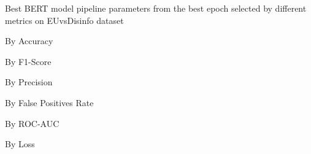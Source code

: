 \begin{table}[!htbp]
    \caption{Best BERT model pipeline parameters from the best epoch selected by different metrics on EUvsDisinfo dataset}
    \label{tab:euvsdisinfo_bert_pipeline_params}
    \centering

    \begin{subtable}[t]{0.48\linewidth}
        \scriptsize
        \caption{By Accuracy}
        
    \end{subtable}
    \hfill
    \begin{subtable}[t]{0.48\linewidth}
        \scriptsize
        \caption{By F1-Score}
        
    \end{subtable}

    \vspace{1em}

    \begin{subtable}[t]{0.48\linewidth}
        \scriptsize
        \caption{By Precision}
        
    \end{subtable}
    \hfill
    \begin{subtable}[t]{0.48\linewidth}
        \scriptsize
        \caption{By False Positives Rate}
        
    \end{subtable}

    \vspace{1em}

    \begin{subtable}[t]{0.48\linewidth}
        \scriptsize
        \caption{By ROC-AUC}
        
    \end{subtable}
    \hfill
    \begin{subtable}[t]{0.48\linewidth}
        \scriptsize
        \caption{By Loss}
        
    \end{subtable}

\end{table}